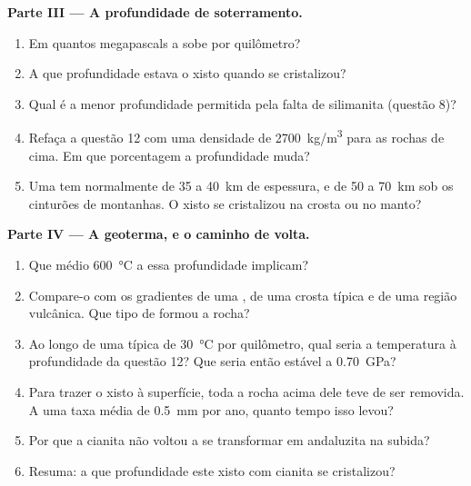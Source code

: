 \begin{problem}
\medskip
\noindent\textbf{Parte III --- A profundidade de soterramento.}
\begin{enumerate}[resume]
  \item Em quantos megapascals a  sobe por quilômetro?
  \item A que profundidade estava o xisto quando se cristalizou?
  \item Qual é a menor profundidade permitida pela falta de silimanita
        (questão 8)?
  \item Refaça a questão 12 com uma densidade de \qty{2700}{kg/m^3} para as
        rochas de cima. Em que porcentagem a profundidade muda?
  \item Uma  tem normalmente de 35 a \qty{40}{km} de
        espessura, e de 50 a \qty{70}{km} sob os cinturões de montanhas. O
        xisto se cristalizou na crosta ou no manto?
\end{enumerate}

\medskip
\noindent\textbf{Parte IV --- A geoterma, e o caminho de volta.}
\begin{enumerate}[resume]
  \item Que  médio \qty{600}{\celsius} a essa
        profundidade implicam?
  \item Compare-o com os gradientes de uma , de uma crosta
        típica e de uma região vulcânica. Que tipo de  formou a
        rocha?
  \item Ao longo de uma  típica de \qty{30}{\celsius} por
        quilômetro, qual seria a temperatura à profundidade da questão 12?
        Que  seria então estável a \qty{0.70}{GPa}?
  \item Para trazer o xisto à superfície, toda a rocha acima dele teve de
        ser removida. A uma taxa média de \qty{0.5}{mm} por ano, quanto tempo
        isso levou?
  \item Por que a cianita não voltou a se transformar em andaluzita na
        subida?
  \item Resuma: a que profundidade este xisto com cianita se cristalizou?
\end{enumerate}
\end{problem}
